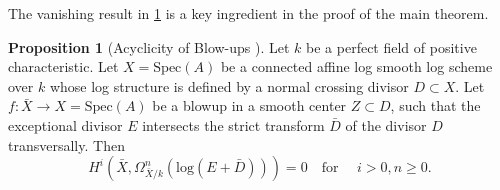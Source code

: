 \documentclass{amsart}
\def\Spec{\textrm{Spec}}
\def\gp{\textrm{gp}}
\theoremstyle{definition}
\newtheorem{example}[theorem]{Example}
\newtheorem{proposition}[theorem]{Proposition}
\newcommand\llog{\mathrm{log}}
\newcommand\dlog{\mathrm{dlog}}
\numberwithin{equation}{section}
\begin{document}
The vanishing result in \cref{AcyclicityProposition} is a key ingredient in the proof of the main theorem.
 \begin{proposition}[{Acyclicity of Blow-ups \cite[Theorem 6.1]{KelleyCohomology} }] \label{AcyclicityProposition}
 		Let $k$ be a perfect field of positive characteristic.
 		Let $X=\Spec(A)$ be a connected affine log smooth log scheme over $k$ whose log structure is defined by a normal crossing divisor $D\subset X$. Let $f:\bar{X}\to X=\Spec(A)$ be a blowup in a smooth center $Z\subset D$, such that the exceptional divisor $E$ intersects the strict transform $\bar{D}$ of the divisor $D$ transversally. Then \[H^i(\bar{X},\Omega^{n}_{\bar{X}/k}(\llog(E+\bar{D})))=0 \quad  \textrm{for } \quad i>0, n\geq 0.\]
 \end{proposition}

	

\end{document}
